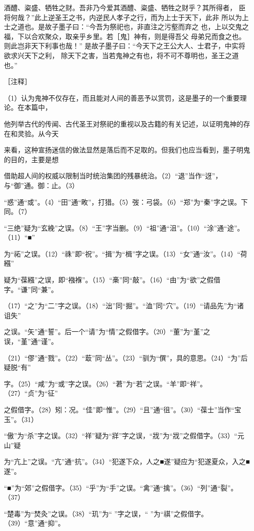 \documentclass[12pt,UTF8]{ctexbook}
\begin{document}
酒醴、粢盛、牺牲之财。吾非乃今爱其酒醴、粢盛、牺牲之财乎？其所得者， 
臣将何哉？”此上逆圣王之书，内逆民人孝子之行，而为上士于天下，此非 
所以为上士之道也。是故子墨子曰：“今吾为祭祀也，非直注之污壑而弃之 
也，上以交鬼之福，下以合欢聚众，取亲乎乡里。若［鬼］神有，则是得吾父 
母弟兄而食之也。则此岂非天下利事也哉！” 
是故子墨子曰：“今天下之王公大人、士君子，中实将欲求兴天下之利， 
除天下之害，当若鬼神之有也，将不可不尊明也，圣王之道也。” 


［注释］ 

（1）认为鬼神不仅存在，而且能对人间的善恶予以赏罚，这是墨子的一个重要理论。在本篇中， 

他列举古代的传闻、古代圣王对祭祀的重视以及古籍的有关记述，以证明鬼神的存在和灵验。从今天 

来看，这种宣扬迷信的做法显然是落后而不足取的。但我们也应当看到，墨子明鬼的目的，主要是想 

借助超人间的权威以限制当时统治集团的残暴统治。（2）“退”当作“迓”，与“御”通。御：止。（3） 

“惑”通“或”。（4）“田”通“畋”，打猎。（5）弢：弓袋。（6）“郑”为“秦”字之误。下同。（7） 

“三绝”疑为“玄絻”之误。（8）“王”字当删。（9）“祖”通“沮”。（10）“涂”通“途”。（11）“■” 

为“祏”之误。（12）“祩”即“祝”。“揖”为“楫”字之误。（13）“女”通“汝”。（14）“荷繦” 

疑为“葆繦”之误，即“襁褓”。（15）“槀”同“敲”。（16）“由”为“欲”之假借字。“谦”同“兼”。 

（17）“之”为“二”字之误。（18）“泏”同“掘”。“洫”同“穴”。（19）“请品先”为“诸诅失” 

之误。“矢”通“誓”。后一个“请”为“情”之假借字。（20）“董”为“堇”之误，“堇”通“谨”。 

（21）“僇”通“戮”。（22）“菆”同“丛”。（23）“驯为“僎”，具的意思。（24）“为”后疑脱“有” 

字。（25）“咸”为“或”字之误。（26）“莙”为“若”之误。“羊”即“祥”。（27）“贞”为“征” 

之假借字。（28）矧：况。“佳”即“惟”。（29）“且”通“徂”。（30）“葆士”当作“宝玉”。（31） 

“傲”为“杀”字之误。（32）“祥”疑为“牂”字之误，“戕”为“戕”之假借字。（33）“元山”疑 

为“亢上”之误。“亢”通“抗”。（34）“犯遂下众，人之■遂”疑应为“犯遂夏众，入之■遂”。 

“■”为“郊”之假借字。（35）“乎”为“手”之误。“禽”通“擒”。（36）“列”通“裂”。（37） 

“楚毒”为“焚灸”之误。（38）“玑”为“ ”字之误，“ ”为“祺”之假借字。（39）“意”通“抑”。 
\end{document}
